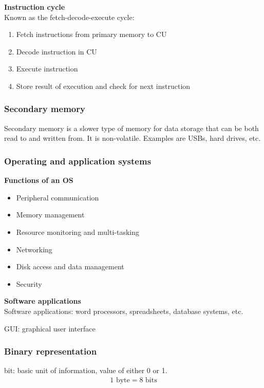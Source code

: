 \documentclass{article}
\begin{document}
\textbf{Instruction cycle} \\
Known as the fetch-decode-execute cycle:
\begin{enumerate}
    \item Fetch instructions from primary memory to CU
    \item Decode instruction in CU
    \item Execute instruction
    \item Store result of execution and check for next instruction
\end{enumerate}

\subsubsection{Secondary memory}

Secondary memory is a slower type of memory for data storage that can be both
read to and written from. It is non-volatile. Examples are USBs, hard drives,
etc.

\subsubsection{Operating and application systems}

\textbf{Functions of an OS}
\begin{itemize}
    \item Peripheral communication
    \item Memory management
    \item Resource monitoring and multi-tasking
    \item Networking
    \item Disk access and data management
    \item Security
\end{itemize}

\textbf{Software applications} \\
Software applications: word processors, spreadsheets, database systems, etc.

GUI: graphical user interface

\subsubsection{Binary representation}

bit: basic unit of information, value of either 0 or 1.
\begin{align*}
    1 \text{ byte} = 8 \text{ bits}
\end{align*}
\end{document}
